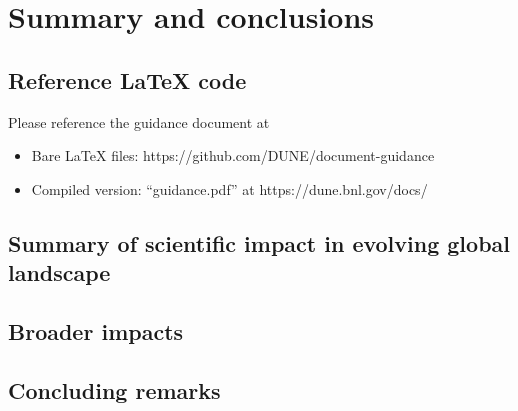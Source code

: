 \chapter{Summary and conclusions}
\label{ch:summ-concl}

\section{Reference LaTeX code}

Please reference the guidance document at 

\begin{itemize}
\item Bare LaTeX files: https://github.com/DUNE/document-guidance
\item Compiled version: ``guidance.pdf'' at https://dune.bnl.gov/docs/
\end{itemize}


\section{Summary of scientific impact in evolving global landscape}
\label{ch:summ-concl-global}


\section{Broader impacts}
\label{ch:summ-concl-broad}


\section{Concluding remarks}
\label{ch:summ-concl-rem}
